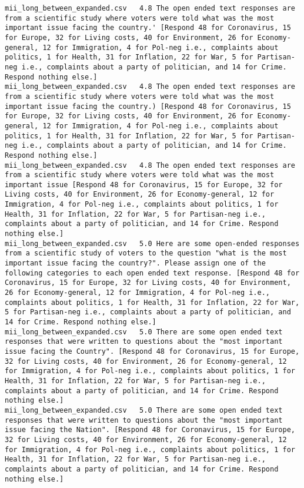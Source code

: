 \begin{lstlisting}[label=lst:promptvariants]
mii_long_between_expanded.csv	4.8	The open ended text responses are from a scientific study where voters were told what was the most important issue facing the country.' [Respond 48 for Coronavirus, 15 for Europe, 32 for Living costs, 40 for Environment, 26 for Economy-general, 12 for Immigration, 4 for Pol-neg i.e., complaints about politics, 1 for Health, 31 for Inflation, 22 for War, 5 for Partisan-neg i.e., complaints about a party of politician, and 14 for Crime. Respond nothing else.]
mii_long_between_expanded.csv	4.8	The open ended text responses are from a scientific study where voters were told what was the most important issue facing the country.) [Respond 48 for Coronavirus, 15 for Europe, 32 for Living costs, 40 for Environment, 26 for Economy-general, 12 for Immigration, 4 for Pol-neg i.e., complaints about politics, 1 for Health, 31 for Inflation, 22 for War, 5 for Partisan-neg i.e., complaints about a party of politician, and 14 for Crime. Respond nothing else.]
mii_long_between_expanded.csv	4.8	The open ended text responses are from a scientific study where voters were told what was the most important issue [Respond 48 for Coronavirus, 15 for Europe, 32 for Living costs, 40 for Environment, 26 for Economy-general, 12 for Immigration, 4 for Pol-neg i.e., complaints about politics, 1 for Health, 31 for Inflation, 22 for War, 5 for Partisan-neg i.e., complaints about a party of politician, and 14 for Crime. Respond nothing else.]
mii_long_between_expanded.csv	5.0	Here are some open-ended responses from a scientific study of voters to the question "what is the most important issue facing the country?". Please assign one of the following categories to each open ended text response. [Respond 48 for Coronavirus, 15 for Europe, 32 for Living costs, 40 for Environment, 26 for Economy-general, 12 for Immigration, 4 for Pol-neg i.e., complaints about politics, 1 for Health, 31 for Inflation, 22 for War, 5 for Partisan-neg i.e., complaints about a party of politician, and 14 for Crime. Respond nothing else.]
mii_long_between_expanded.csv	5.0	There are some open ended text responses that were written to questions about the "most important issue facing the Country". [Respond 48 for Coronavirus, 15 for Europe, 32 for Living costs, 40 for Environment, 26 for Economy-general, 12 for Immigration, 4 for Pol-neg i.e., complaints about politics, 1 for Health, 31 for Inflation, 22 for War, 5 for Partisan-neg i.e., complaints about a party of politician, and 14 for Crime. Respond nothing else.]
mii_long_between_expanded.csv	5.0	There are some open ended text responses that were written to questions about the "most important issue facing the Nation". [Respond 48 for Coronavirus, 15 for Europe, 32 for Living costs, 40 for Environment, 26 for Economy-general, 12 for Immigration, 4 for Pol-neg i.e., complaints about politics, 1 for Health, 31 for Inflation, 22 for War, 5 for Partisan-neg i.e., complaints about a party of politician, and 14 for Crime. Respond nothing else.]

\end{lstlisting}
